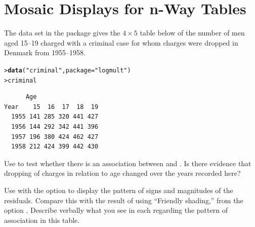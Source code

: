 \documentclass[11pt]{report}\usepackage[]{graphicx}\usepackage[]{color}
\makeatletter
\newcommand{\hlstr}[1]{\textcolor[rgb]{0.192,0.494,0.8}{#1}}%
\newcommand{\hlstd}[1]{\textcolor[rgb]{0.345,0.345,0.345}{#1}}%
\newcommand{\hlkwc}[1]{\textcolor[rgb]{0.333,0.667,0.333}{#1}}%
\newcommand{\hlkwd}[1]{\textcolor[rgb]{0.737,0.353,0.396}{\textbf{#1}}}%
\newenvironment{kframe}{%
 \def\at@end@of@kframe{}%
 \ifinner\ifhmode%
  \def\at@end@of@kframe{\end{minipage}}%
  \begin{minipage}{\columnwidth}%
 \fi\fi%
 \def\FrameCommand##1{\hskip\@totalleftmargin \hskip-\fboxsep
 \colorbox{shadecolor}{##1}\hskip-\fboxsep
     \hskip-\linewidth \hskip-\@totalleftmargin \hskip\columnwidth}%
 \MakeFramed {\advance\hsize-\width
   \@totalleftmargin\z@ \linewidth\hsize
   \@setminipage}}%
 {\par\unskip\endMakeFramed%
 \at@end@of@kframe}
\newenvironment{knitrout}{}{} %
\renewenvironment{knitrout}{\small\renewcommand{\baselinestretch}{.85}}{} %
\makeatother
\begin{document}
\chapter[Mosaic Displays for n-Way Tables]{Mosaic Displays for n-Way \mbox{Tables}}\label{ch:mosaic}


\begin{Exercises}

\exercise\label{lab:mosaic-criminal} The data set  in the package  gives the
$4 \times 5$ table below of the
number of men aged 15--19 charged with a criminal case for whom charges were dropped
in Denmark from 1955--1958.
\begin{knitrout}
\color{fgcolor}\begin{kframe}
\begin{alltt}
\hlstd{> }\hlkwd{data}\hlstd{(}\hlstr{"criminal"}\hlstd{,} \hlkwc{package} \hlstd{=} \hlstr{"logmult"}\hlstd{)}
\hlstd{> }\hlstd{criminal}
\end{alltt}
\begin{verbatim}
      Age
Year    15  16  17  18  19
  1955 141 285 320 441 427
  1956 144 292 342 441 396
  1957 196 380 424 462 427
  1958 212 424 399 442 430
\end{verbatim}
\end{kframe}
\end{knitrout}
  \begin{enumerate*}
    \item Use  to test whether there is an association between 
    and .  Is there evidence that dropping of charges in relation to
    age changed over the years recorded here?
    \item Use  with the option  to display the
    pattern of signs and magnitudes of the residuals.  Compare this with the
    result of  using ``Friendly shading,'' from
    the option .  Describe verbally what you see
    in each regarding the pattern of association in this table.
  \end{enumerate*}


\end{Exercises}
\end{document}
